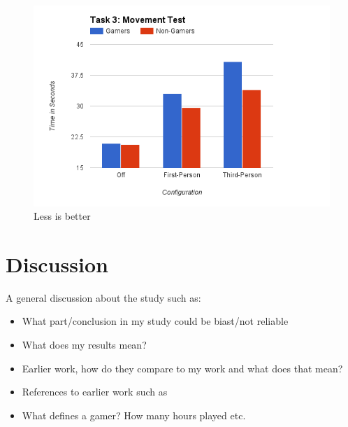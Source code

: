 \documentclass[runningheads,a4paper,oribibl]{llncs}
\begin{document}
\begin{figure}
   \centering
   \includegraphics[width=\textwidth]{ExternalMaterial/Task3Graph}
   \caption{Less is better} \label{fig:Task3Graph}
\end{figure}













\section{Discussion}
A general discussion about the study such as:
\begin{itemize}
	\item What part/conclusion in my study could be biast/not reliable
	\item What does my results mean?
	\item Earlier work, how do they compare to my work and what does that mean?
	\item References to earlier work such as~\cite{schmierbach2011exploring}
	\item What defines a gamer? How many hours played etc.
\end{itemize}
\end{document}
